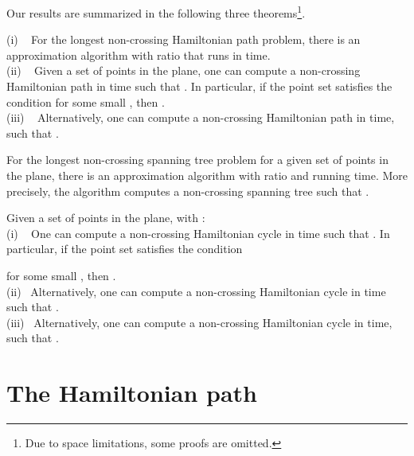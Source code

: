 \documentclass[proceedings]{stacs}
\newcommand{\old}[1]{{}}
\begin{document}
Our results are summarized in the following three
theorems\footnote{Due to space limitations, some proofs are omitted.}.


\begin{theorem} \label{T1}
{\rm (i) \ } For the longest non-crossing Hamiltonian path problem,
there is an approximation algorithm with ratio 
that runs in  time.\\
{\rm (ii) \ }
Given a set of  points in the plane, one can
compute a  non-crossing Hamiltonian path  in 
time such that .
In particular, if the point set satisfies the condition
 for some small ,
then .\\
{\rm (iii) \ } Alternatively, one can compute a  non-crossing Hamiltonian path
 in  time,
such that .
\end{theorem}

\begin{theorem} \label{T2}
For the longest non-crossing spanning tree problem for
a given set of  points in the plane, there is an
approximation algorithm with ratio  and   running
time. More precisely, the algorithm computes a non-crossing spanning
tree  such that .
\end{theorem}

\old{
Although our improvement in the approximation ratio for spanning trees
is very small, it shows that the ``barrier'' of  can be broken.
Also, while from a practical standpoint the improvement
in the running time is the most significant aspect, from a theoretical
perspective the improvement in the approximation ratio is the most
challenging part of our result.
} 

\begin{theorem} \label{T3}
Given a set  of  points in the plane, with : \\
{\rm (i) \ } One can
compute a  non-crossing Hamiltonian cycle  in 
time such that .
In particular, if the point set satisfies the condition

for some small ,
then . \\
{\rm (ii)\ } Alternatively,  one can compute a non-crossing
Hamiltonian cycle  in   time such that . \\
{\rm (iii)\ } Alternatively, one can compute a  non-crossing
Hamiltonian cycle  in  time, such that
.
\end{theorem}



\section{The Hamiltonian path} \label{sec:path}
\end{document}
